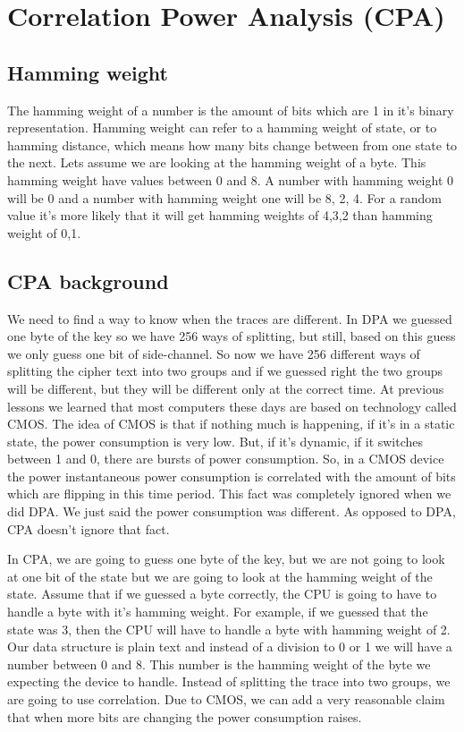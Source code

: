 \section{Correlation Power Analysis (CPA)}\label{c8_cpa:sec}

\subsection{Hamming weight}\label{c8_CPA_hamming_weight:subsec}

The hamming weight of a number is the amount of bits which are 1 in it's binary
representation. Hamming weight can refer to a hamming weight of state, or to
hamming distance, which means how many bits change between from one state to the
next. Lets assume we are looking at the hamming weight of a byte. This hamming
weight have values between 0 and 8. A number with hamming weight 0 will be 0 and
a number with hamming weight one will be 8, 2, 4. For a random value it's more
likely that it will get hamming weights of 4,3,2 than hamming weight of 0,1.

\subsection{CPA background}\label{c8_CPA_background:subsec}

We need to find a way to know when the traces are different. In DPA we guessed
one byte of the key so we have 256 ways of splitting, but still, based on this
guess we only guess one bit of side-channel. So now we have 256 different ways
of splitting the cipher text into two groups and if we guessed right the two
groups will be different, but they will be different only at the correct time.
At previous lessons we learned that most computers these days are based on
technology called CMOS. The idea of CMOS is that if nothing much is happening,
if it's in a static state,  the power consumption is very low. But, if it's
dynamic, if it switches between 1 and 0, there are bursts of power consumption.
So, in a CMOS device the power instantaneous power consumption is correlated
with the amount of bits which are flipping in this time period. This fact was
completely ignored when we did DPA. We just said the power consumption was
different. As opposed to DPA, CPA doesn't ignore that fact. 

In CPA, we are going to guess one byte of the key, but we are not going to look
at one bit of the state but we are going to look at the hamming weight of the
state. Assume that if we guessed a byte correctly, the CPU is going to have to
handle a byte with it's hamming weight. For example, if we  guessed that the
state was 3, then the CPU will have to handle a byte with hamming weight of 2.
Our data structure is plain text and instead of a division to 0 or 1 we will
have a number between 0 and 8. This number is the hamming weight of the byte we
expecting the device to handle. Instead of splitting the trace into two groups,
we are going to use correlation. Due to CMOS, we can add a very reasonable claim
that when more bits are changing the power consumption raises.

